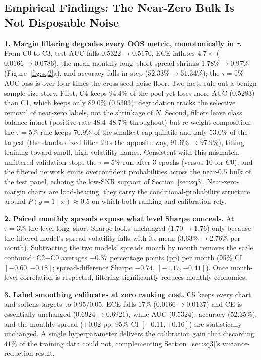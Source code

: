 \documentclass[10pt]{article}
\begin{document}
\subsection{Empirical Findings: The Near-Zero Bulk Is Not Disposable Noise}
\textbf{1. Margin filtering degrades every OOS metric, monotonically in $\tau$.} From C0 to C3, test AUC falls $0.5322 \to 0.5170$, ECE inflates $4.7\times$ ($0.0166 \to 0.0786$), the mean monthly long--short spread shrinks $1.78\% \to 0.97\%$ (Figure~\ref{fig:sq2}a), and accuracy falls in step ($52.33\% \to 51.34\%$); the $\tau = 5\%$ AUC loss is over four times the cross-seed noise floor. Two facts rule out a benign sample-size story. First, C4 keeps $94.4\%$ of the pool yet loses more AUC ($0.5283$) than C1, which keeps only $89.0\%$ ($0.5303$): degradation tracks the selective removal of near-zero labels, not the shrinkage of $N$. Second, filters leave class balance intact (positive rate $48.4$--$48.7\%$ throughout) but re-weight composition: the $\tau = 5\%$ rule keeps $70.9\%$ of the smallest-cap quintile and only $53.0\%$ of the largest (the standardized filter tilts the opposite way, $91.6\% \to 97.9\%$), tilting training toward small, high-volatility names. Consistent with this mismatch, unfiltered validation stops the $\tau = 5\%$ run after 3 epochs (versus 10 for C0), and the filtered network emits overconfident probabilities across the near-$0.5$ bulk of the test panel, echoing the low-SNR support of Section~\ref{sec:sq3}. Near-zero-margin charts are load-bearing: they carry the conditional-probability structure around $P(y{=}1 \mid x) \approx 0.5$ on which both ranking and calibration rely.

\textbf{2. Paired monthly spreads expose what level Sharpe conceals.} At $\tau = 3\%$ the level long--short Sharpe looks unchanged ($1.70 \to 1.76$) only because the filtered model's spread volatility falls with its mean ($3.63\% \to 2.76\%$ per month). Subtracting the two models' spreads month by month removes the scale confound: C2$-$C0 averages $-0.37$ percentage points (pp) per month (95\% CI $[-0.60, -0.18]$; spread-difference Sharpe $-0.74$, $[-1.17, -0.41]$). Once month-level correlation is respected, filtering significantly reduces monthly economics.

\textbf{3. Label smoothing calibrates at zero ranking cost.} C5 keeps every chart and softens targets to $0.95/0.05$: ECE falls $17\%$ ($0.0166 \to 0.0137$) and CE is essentially unchanged ($0.6924 \to 0.6921$), while AUC ($0.5324$), accuracy ($52.35\%$), and the monthly spread ($+0.02$ pp, 95\% CI $[-0.11, +0.16]$) are statistically unchanged. A single hyperparameter delivers the calibration gain that discarding $41\%$ of the training data could not, complementing Section~\ref{sec:sq3}'s variance-reduction result.
\end{document}
